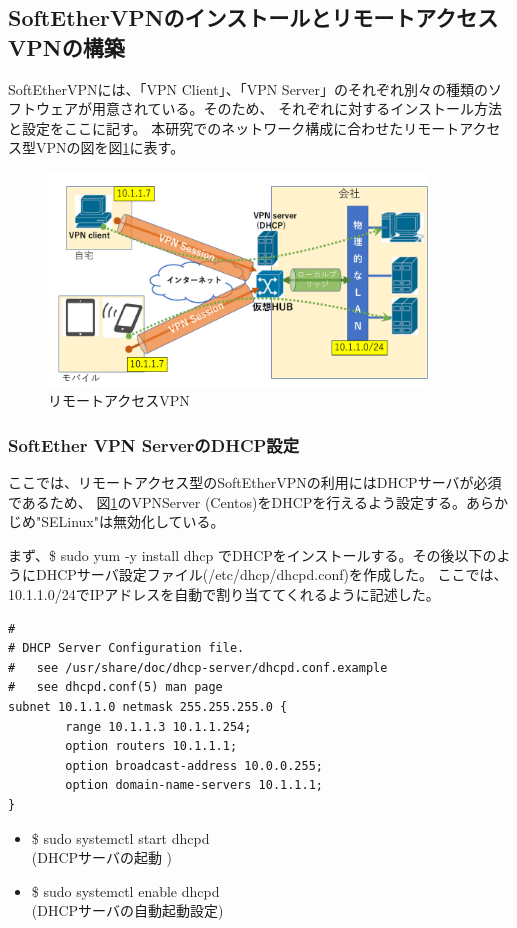 \documentclass[11pt,a4j,titlepage]{jreport}
\begin{document}
\subsection*{SoftEtherVPNのインストールとリモートアクセスVPNの構築}
SoftEtherVPNには、「VPN Client」、「VPN Server」のそれぞれ別々の種類のソフトウェアが用意されている。そのため、
それぞれに対するインストール方法と設定をここに記す。
本研究でのネットワーク構成に合わせたリモートアクセス型VPNの図を図\ref{softether}に表す。

\begin{figure}[tbp]
    \centering
    \includegraphics*[width=0.9\textwidth,page=2]{graphs/softetherVPN.pdf}
    \caption{リモートアクセスVPN}
    \label{softether}
\end{figure}
\subsubsection*{SoftEther VPN ServerのDHCP設定}
ここでは、リモートアクセス型のSoftEtherVPNの利用にはDHCPサーバが必須であるため、
図\ref{softether}のVPNServer (Centos)をDHCPを行えるよう設定する。あらかじめ"SELinux"は無効化している。\par
まず、\$ sudo yum -y install dhcp でDHCPをインストールする。その後以下のようにDHCPサーバ設定ファイル(/etc/dhcp/dhcpd.conf)を作成した。
ここでは、10.1.1.0/24でIPアドレスを自動で割り当ててくれるように記述した。
\begin{lstlisting}
#
# DHCP Server Configuration file.
#   see /usr/share/doc/dhcp-server/dhcpd.conf.example
#   see dhcpd.conf(5) man page
subnet 10.1.1.0 netmask 255.255.255.0 {
        range 10.1.1.3 10.1.1.254;
        option routers 10.1.1.1;
        option broadcast-address 10.0.0.255;
        option domain-name-servers 10.1.1.1;
} 

\end{lstlisting}
\begin{itemize}
    \setlength{\parskip}{0.0cm} %
    \setlength{\itemsep}{0.0cm} 
    \item \$ sudo systemctl start dhcpd \\(DHCPサーバの起動 )
    \item \$ sudo systemctl enable dhcpd \\(DHCPサーバの自動起動設定)
\end{itemize}
\end{document}

